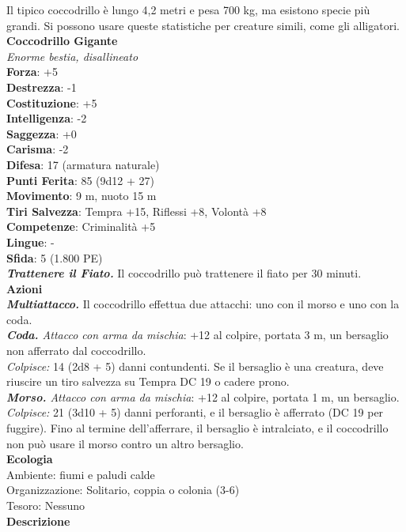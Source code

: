 \begin{multicols}{2}
Il tipico coccodrillo è lungo 4,2 metri e pesa 700 kg, ma esistono specie più grandi. Si possono usare queste statistiche per creature simili, come gli alligatori. \\


\medskip\textbf{Coccodrillo Gigante}\\
\emph{Enorme bestia, disallineato}\\
\textbf{Forza}: +5\\
\textbf{Destrezza}: -1\\
\textbf{Costituzione}: +5\\
\textbf{Intelligenza}: -2\\
\textbf{Saggezza}: +0\\
\textbf{Carisma}: -2\\
\textbf{Difesa}: 17 (armatura naturale)\\
\textbf{Punti Ferita}: 85 (9d12 + 27)\\
\textbf{Movimento}: 9 m, nuoto 15 m\\
\textbf{Tiri Salvezza}: Tempra +15, Riflessi +8, Volontà +8 \\
\textbf{Competenze}: Criminalità +5\\
\textbf{Lingue}: -\\
\textbf{Sfida}: 5 (1.800 PE)\smallskip\\
\emph{\textbf{Trattenere il Fiato.}} Il coccodrillo può trattenere il fiato per 30 minuti.\\
\smallskip\textbf{Azioni}\\
\emph{\textbf{Multiattacco.}} Il coccodrillo effettua due attacchi: uno con il morso e uno con la coda.\\
\emph{\textbf{Coda.} Attacco con arma da mischia}: +12 al colpire, portata 3 m, un bersaglio non afferrato dal coccodrillo.\\
\emph{Colpisce:} 14 (2d8 + 5) danni contundenti. Se il bersaglio è una creatura, deve riuscire un tiro salvezza su Tempra DC  19 o cadere prono.\\
\emph{\textbf{Morso.} Attacco con arma da mischia}: +12 al colpire, portata 1 m, un bersaglio.\\
\emph{Colpisce:} 21 (3d10 + 5) danni perforanti, e il bersaglio è afferrato (DC  19 per fuggire). Fino al termine dell'afferrare, il bersaglio è intralciato, e il coccodrillo non può usare il morso contro un altro bersaglio.\\
\textbf{Ecologia}\\
Ambiente: fiumi e paludi calde\\
Organizzazione: Solitario, coppia o colonia (3-6)\\
Tesoro: Nessuno\\
\textbf{Descrizione}\\


\end{multicols}
